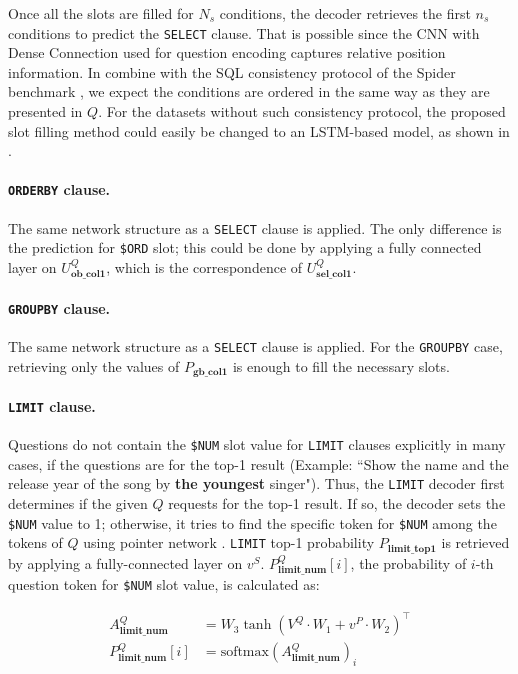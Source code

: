 \documentclass[11pt,a4paper]{article}
\begin{document}
Once all the slots are filled for $N_s$ conditions, the decoder retrieves the first $n_s$ conditions to predict the \texttt{SELECT} clause. That is possible since the CNN with Dense Connection used for question encoding \citep{Yoon18} captures relative position information. In combine with the SQL consistency protocol of the Spider benchmark \citep{Yu:18}, we expect the conditions are ordered in the same way as they are presented in $Q$. For the datasets without such consistency protocol, the proposed slot filling method could easily be changed to an LSTM-based model, as shown in \citet{sqlnet}.  

\paragraph{\texttt{ORDERBY} clause.} The same network structure as a \texttt{SELECT} clause is applied. The only difference is the prediction for \texttt{\$ORD} slot; this could be done by applying a fully connected layer on $U^Q_\textbf{ob\_col1}$, which is the correspondence of $U^Q_\textbf{sel\_col1}$.


\paragraph{\texttt{GROUPBY} clause.} The same network structure  as a \texttt{SELECT} clause is applied. For the \texttt{GROUPBY} case, retrieving only the values of $P_\textbf{gb\_col1}$ is enough to fill the necessary slots.

\paragraph{\texttt{LIMIT} clause.} Questions do not contain the \texttt{\$NUM} slot value for \texttt{LIMIT} clauses explicitly in many cases, if the questions are for the top-1 result (Example: ``Show the name and the release year of the song by \textbf{the youngest} singer"). Thus, the \texttt{LIMIT} decoder first determines if the given $Q$ requests for the top-1 result. If so, the decoder sets the \texttt{\$NUM} value to 1; otherwise, it tries to find the specific token for \texttt{\$NUM} among the tokens of $Q$ using pointer network \citep{pointer}. \texttt{LIMIT} top-1 probability $P_{\textbf{limit\_top1}}$ is retrieved by applying a fully-connected layer on $v^S$. $P^Q_{\textbf{limit\_num}}[i]$, the probability of $i$-th question token for \texttt{\$NUM} slot value, is calculated as:

\begin{align}
A^Q_{\textbf{limit\_num}} &= W_3\tanh(V^Q \cdot W_1 + v^P \cdot W_2 )^\intercal \nonumber \\
P^Q_{\textbf{limit\_num}}[i] &= \text{softmax} (A^Q_{\textbf{limit\_num}})_i
\end{align}
\end{document}
